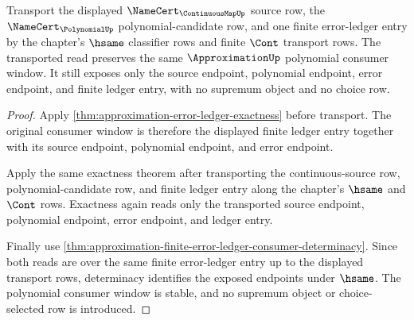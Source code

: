 \begin{theorem}
\label{thm:approximation-no-choice-polynomial-window-stability}
Transport the displayed $\NameCert_{\ContinuousMapUp}$ source row, the
$\NameCert_{\PolynomialUp}$ polynomial-candidate row, and one finite
error-ledger entry by the chapter's $\hsame$ classifier rows and finite
$\Cont$ transport rows. The transported read preserves the same
$\ApproximationUp$ polynomial consumer window. It still exposes only the
source endpoint, polynomial endpoint, error endpoint, and finite ledger entry,
with no supremum object and no choice row.
\end{theorem}
\begin{proof}
Apply \autoref{thm:approximation-error-ledger-exactness} before transport.
The original consumer window is therefore the displayed finite ledger entry
together with its source endpoint, polynomial endpoint, and error endpoint.

Apply the same exactness theorem after transporting the continuous-source row,
polynomial-candidate row, and finite ledger entry along the chapter's
$\hsame$ and $\Cont$ rows. Exactness again reads only the transported source
endpoint, polynomial endpoint, error endpoint, and ledger entry.

Finally use
\autoref{thm:approximation-finite-error-ledger-consumer-determinacy}. Since
both reads are over the same finite error-ledger entry up to the displayed
transport rows, determinacy identifies the exposed endpoints under $\hsame$.
The polynomial consumer window is stable, and no supremum object or
choice-selected row is introduced.
\end{proof}

